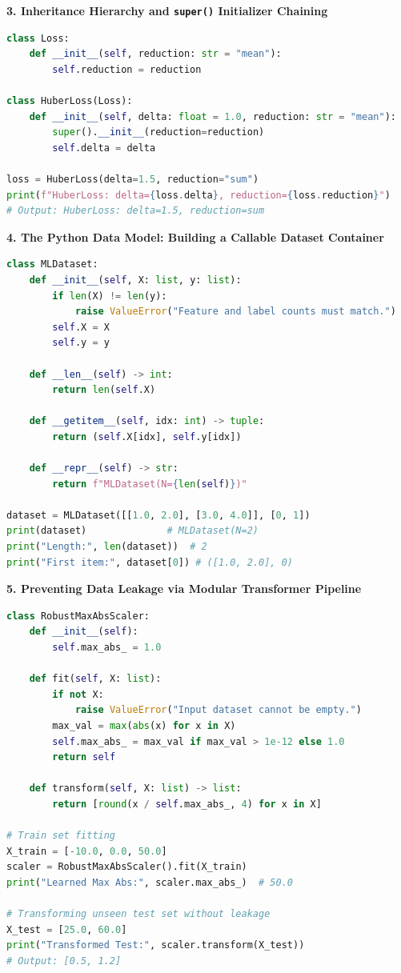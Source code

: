 \textbf{3. Inheritance Hierarchy and \texttt{super()} Initializer Chaining}
\begin{lstlisting}[language=Python]
class Loss:
    def __init__(self, reduction: str = "mean"):
        self.reduction = reduction

class HuberLoss(Loss):
    def __init__(self, delta: float = 1.0, reduction: str = "mean"):
        super().__init__(reduction=reduction)
        self.delta = delta

loss = HuberLoss(delta=1.5, reduction="sum")
print(f"HuberLoss: delta={loss.delta}, reduction={loss.reduction}")
# Output: HuberLoss: delta=1.5, reduction=sum
\end{lstlisting}

\textbf{4. The Python Data Model: Building a Callable Dataset Container}
\begin{lstlisting}[language=Python]
class MLDataset:
    def __init__(self, X: list, y: list):
        if len(X) != len(y):
            raise ValueError("Feature and label counts must match.")
        self.X = X
        self.y = y

    def __len__(self) -> int:
        return len(self.X)

    def __getitem__(self, idx: int) -> tuple:
        return (self.X[idx], self.y[idx])

    def __repr__(self) -> str:
        return f"MLDataset(N={len(self)})"

dataset = MLDataset([[1.0, 2.0], [3.0, 4.0]], [0, 1])
print(dataset)              # MLDataset(N=2)
print("Length:", len(dataset))  # 2
print("First item:", dataset[0]) # ([1.0, 2.0], 0)
\end{lstlisting}

\textbf{5. Preventing Data Leakage via Modular Transformer Pipeline}
\begin{lstlisting}[language=Python]
class RobustMaxAbsScaler:
    def __init__(self):
        self.max_abs_ = 1.0

    def fit(self, X: list):
        if not X:
            raise ValueError("Input dataset cannot be empty.")
        max_val = max(abs(x) for x in X)
        self.max_abs_ = max_val if max_val > 1e-12 else 1.0
        return self

    def transform(self, X: list) -> list:
        return [round(x / self.max_abs_, 4) for x in X]

# Train set fitting
X_train = [-10.0, 0.0, 50.0]
scaler = RobustMaxAbsScaler().fit(X_train)
print("Learned Max Abs:", scaler.max_abs_)  # 50.0

# Transforming unseen test set without leakage
X_test = [25.0, 60.0]
print("Transformed Test:", scaler.transform(X_test))
# Output: [0.5, 1.2]
\end{lstlisting}

